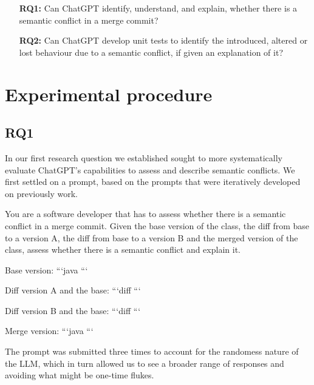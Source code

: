 \begin{itemize}
  \item[\textbf{RQ1:}] Can ChatGPT identify, understand, and explain, whether
  there is a semantic conflict in a merge commit?

  \item[\textbf{RQ2:}] Can ChatGPT develop unit tests to identify the introduced, altered or lost behaviour due to a semantic conflict, if given an explanation of it?
\end{itemize}

\section{Experimental procedure}

\subsection{RQ1}

In our first research question we established sought to more systematically evaluate ChatGPT's capabilities to assess and describe semantic conflicts.
We first settled on a prompt, based on the prompts that were iteratively developed on previously work.

\begin{prompt}
You are a software developer that has to assess whether there is a semantic conflict in a merge commit.  Given the base version of the class, the diff from base to a version A, the diff from base to a version B and the merged version of the class, assess whether there is a semantic conflict and explain it.

Base version:
```java
```

Diff version A and the base:
```diff
```

Diff version B and the base:
```diff
```

Merge version:
```java
```
\end{prompt}

The prompt was submitted three times to account for the randomess nature of the
LLM, which in turn allowed us to see a broader range of responses and avoiding
what might be one-time flukes.

